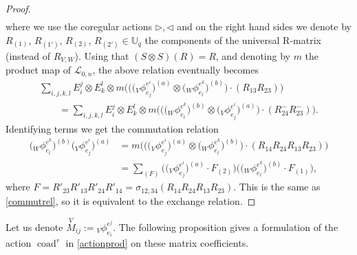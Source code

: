 \documentclass[pdftex]{sigma}%
\numberwithin{equation}{section}
\numberwithin{figure}{section}
\newcommand{\mUq}{\mathbb{U}_q}
\newcommand{\Ll}{{\mathcal L}}
\begin{document}
\begin{proof}
\begin{gather*}
\end{gather*}
where we use the coregular actions $\rhd, \lhd$ and on the right hand sides we denote by $R_{(1)}$, $R_{(1')}$, $R_{(2)}$, $R_{(2')}\in \mUq$ the components of the universal R-matrix (instead of $R_{V,W}$). Using that $( S\otimes S)(R) = R$, and denoting by $m$ the product map of $\Ll_{0,n}$, the above relation eventually becomes
 \begin{gather*}
 \sum_{i,j,k,l} E_i^j \otimes E_k^l \otimes m\big(\big(\big({}_V\phi^{e^i}_{e_j}\big)^{(a)} \otimes \big({}_W\phi^{e^k}_{e_l}\big)^{(b)}\big) \cdot (R_{13}R_{23})\big)
 \\ \qquad
 {}= \sum_{i,j,k,l} E_i^j\otimes E_k^l \otimes m\big(\big(\big({}_W\phi^{e^k}_{e_l}\big)^{(b)} \otimes \big({}_V\phi^{e^i}_{e_j}\big)^{(a)}\big) \cdot (R_{24}^-R_{23}^-)\big).
 \end{gather*}
Identifying terms we get the commutation relation
\begin{align}
\big({}_W\phi^{e^k}_{e_l}\big)^{(b)}\big({}_V\phi^{e^i}_{e_j}\big)^{(a)} & = m\big(\big(\big({}_V\phi^{e^i}_{e_j}\big)^{(a)} \otimes \big({}_W\phi^{e^k}_{e_l}\big)^{(b)}\big) \cdot (R_{14}R_{24}R_{13}R_{23})\big)
\nonumber
\\
& = \sum_{(F)} \big(\big({}_V\phi^{e^i}_{e_j}\big)^{(a)}\cdot F_{(2)}\big)\big(\big({}_W\phi^{e^k}_{e_l}\big)^{(b)}\cdot F_{(1)}\big),
\label{lastformMV}
\end{align}
where $\textstyle F = R'_{23}R'_{13}R'_{24}R'_{14} = \sigma_{12,34}(R_{14}R_{24}R_{13}R_{23})$. This is the same as \eqref{commutrel}, so it is equivalent to the exchange relation. \end{proof}

Let us denote $\stackrel{V}{M}_{ij} := {}_V\phi^{e^j}_{e_i}$. The following proposition gives a formulation of the action $\operatorname{coad}^r$ in \eqref{actionprod} on these matrix coefficients.
\end{document}
